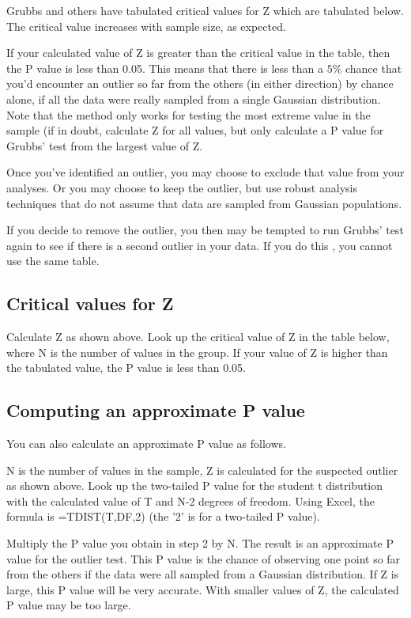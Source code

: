 Grubbs and others have tabulated critical values for Z which are tabulated below. The critical value increases with sample size, as expected.

If your calculated value of Z is greater than the critical value in the table, then the P value is less than 0.05. This means that there is less than a $5\%$ chance that you'd encounter an outlier so far from the others (in either direction) by chance alone, if all the data were really sampled from a single Gaussian distribution. Note that the method only works for testing the most extreme value in the sample (if in doubt, calculate Z for all values, but only calculate a P value for Grubbs' test from the largest value of Z.

Once you've identified an outlier, you may choose to exclude that value from your analyses. Or you may choose to keep the outlier, but use robust analysis techniques that do not assume that data are sampled from Gaussian populations.

If you decide to remove the outlier, you then may be tempted to run Grubbs' test again to see if there is a second outlier in your data. If you do this , you cannot use the same table.


\subsection{Critical values for Z}

Calculate Z as shown above. Look up the critical value of Z in the table below, where N is the number of values in the group. If your value of Z is higher than the tabulated value, the P value is less than 0.05.








\subsection{Computing an approximate P value}

You can also calculate an approximate P value as follows.


N is the number of values in the sample, Z is calculated for the suspected outlier as shown above.
Look up the two-tailed P value for the student t distribution with the calculated value of T and N-2 degrees of freedom. Using Excel, the formula is =TDIST(T,DF,2) (the '2' is for a two-tailed P value).


Multiply the P value you obtain in step 2 by N. The result is an approximate P value for the outlier test. This P value is the chance of observing one point so far from the others if the data were all sampled from a Gaussian distribution. If Z is large, this P value will be very accurate. With smaller values of Z, the calculated P value may be too large.




